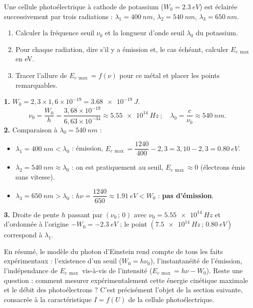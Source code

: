 \documentclass[11pt]{article}
\begin{document}
\begin{exercice}
Une cellule photoélectrique à cathode de potassium ($W_0 = \SI{2,3}{eV}$) est éclairée successivement par trois radiations : $\lambda_1 = \SI{400}{nm}$, $\lambda_2 = \SI{540}{nm}$, $\lambda_3 = \SI{650}{nm}$.
\begin{enumerate}
\item Calculer la fréquence seuil $\nu_0$ et la longueur d'onde seuil $\lambda_0$ du potassium.
\item Pour chaque radiation, dire s'il y a émission et, le cas échéant, calculer $E_{c\,\max}$ en eV.
\item Tracer l'allure de $E_{c\,\max} = f(\nu)$ pour ce métal et placer les points remarquables.
\end{enumerate}
\end{exercice}

\begin{corrige}
\textbf{1.} $W_0 = 2{,}3 \times 1{,}6 \times 10^{-19} = \SI{3,68e-19}{J}$.
\[
\nu_0 = \dfrac{W_0}{h} = \dfrac{3{,}68 \times 10^{-19}}{6{,}63 \times 10^{-34}} \approx \SI{5,55e14}{Hz} \ ; \quad \lambda_0 = \dfrac{c}{\nu_0} \approx \SI{540}{nm}.
\]
\textbf{2.} Comparaison à $\lambda_0 = \SI{540}{nm}$ :
\begin{itemize}
\item $\lambda_1 = \SI{400}{nm} < \lambda_0$ : émission, $E_{c\,\max} = \dfrac{1240}{400} - 2{,}3 = 3{,}10 - 2{,}3 = \SI{0,80}{eV}$.
\item $\lambda_2 = \SI{540}{nm} \approx \lambda_0$ : on est pratiquement au seuil, $E_{c\,\max} \approx 0$ (électrons émis sans vitesse).
\item $\lambda_3 = \SI{650}{nm} > \lambda_0$ : $h\nu = \dfrac{1240}{650} \approx \SI{1,91}{eV} < W_0$ : \textbf{pas d'émission}.
\end{itemize}
\textbf{3.} Droite de pente $h$ passant par $(\nu_0\,;\,0)$ avec $\nu_0 = \SI{5,55e14}{Hz}$ et d'ordonnée à l'origine $-W_0 = \SI{-2,3}{eV}$ ; le point $(\SI{7,5e14}{Hz}\,;\,\SI{0,80}{eV})$ correspond à $\lambda_1$.
\end{corrige}

En résumé, le modèle du photon d'Einstein rend compte de tous les faits expérimentaux : l'existence d'un seuil ($W_0 = h\nu_0$), l'instantanéité de l'émission, l'indépendance de $E_{c\,\max}$ vis-à-vis de l'intensité ($E_{c\,\max} = h\nu - W_0$). Reste une question : comment mesurer expérimentalement cette énergie cinétique maximale et le débit des photoélectrons ? C'est précisément l'objet de la section suivante, consacrée à la caractéristique $I = f(U)$ de la cellule photoélectrique.
\end{document}
